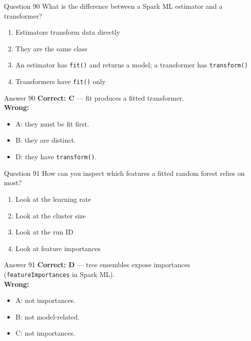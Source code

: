 \documentclass[aspectratio=169,11pt]{beamer}
\begin{document}
	\begin{frame}{Question 90}
		What is the difference between a Spark ML estimator and a transformer?
		\begin{enumerate}[label=\Alph*.]
			\item Estimators transform data directly
			\item They are the same class
			\item An estimator has \texttt{fit()} and returns a model; a transformer has \texttt{transform()}
			\item Transformers have \texttt{fit()} only
		\end{enumerate}
	\end{frame}
	\begin{frame}{Answer 90}
		\textbf{Correct: C} --- fit produces a fitted transformer.\\
		\vspace{0.5em}
		\textbf{Wrong:}
		\begin{itemize}
			\item A: they must be fit first.
			\item B: they are distinct.
			\item D: they have \texttt{transform()}.
		\end{itemize}
	\end{frame}
	
	\begin{frame}{Question 91}
		How can you inspect which features a fitted random forest relies on most?
		\begin{enumerate}[label=\Alph*.]
			\item Look at the learning rate
			\item Look at the cluster size
			\item Look at the run ID
			\item Look at feature importances
		\end{enumerate}
	\end{frame}
	\begin{frame}{Answer 91}
		\textbf{Correct: D} --- tree ensembles expose importances (\texttt{featureImportances} in Spark ML).\\
		\vspace{0.5em}
		\textbf{Wrong:}
		\begin{itemize}
			\item A: not importances.
			\item B: not model-related.
			\item C: not importances.
		\end{itemize}
	\end{frame}
	
\end{document}

